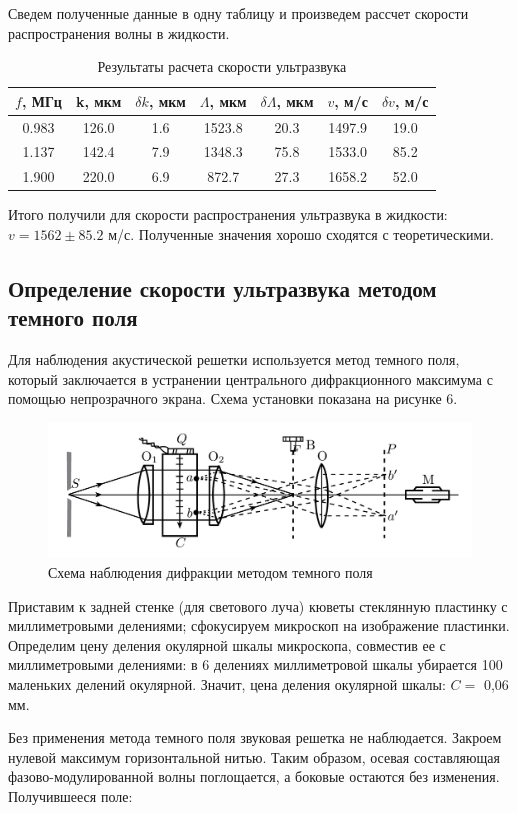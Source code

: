 \documentclass[a4paper, 12pt]{article}%
\begin{document}
	Сведем полученные данные в одну таблицу и произведем рассчет скорости распространения волны в жидкости.
	\begin{table}[H]
		\centering
		\begin{tabular}{|c|c|c|c|c|c|c|}
			\hline
			$f$, МГц     & k, мкм     & $\delta k$, мкм & $\Lambda$, мкм & $\delta \Lambda$, мкм & $v$, м/с      &  $\delta v$, м/с  \\ \hline
			0.983 & 126.0 & 1.6     & 1523.8 & 20.3         & 1497.9 & 19.0    \\ \hline
			1.137 & 142.4 & 7.9     & 1348.3 & 75.8         & 1533.0 & 85.2    \\ \hline
			1.900 & 220.0 & 6.9     & 872.7  & 27.3         & 1658.2 & 52.0    \\ \hline
		\end{tabular}
		\caption{Результаты расчета скорости ультразвука}
	\end{table}
	Итого получили для скорости распространения ультразвука в жидкости: $v = 1562 \pm 85.2$ м/с. Полученные значения хорошо сходятся с теоретическими.
	\subsection{Определение скорости ультразвука методом темного поля}
	
	Для наблюдения акустической решетки используется метод темного поля, который заключается в устранении центрального дифракционного максимума с помощью непрозрачного экрана. Схема установки показана на рисунке 6.
	\begin{figure}[H]
		\centering	
		\includegraphics[width=0.7\linewidth]{shema2.png}
		\caption{Схема наблюдения дифракции методом темного поля}
		\label{fig:}
	\end{figure}
	Приставим к задней стенке (для светового луча) кюветы стеклянную пластинку с миллиметровыми делениями; сфокусируем микроскоп на изображение пластинки. Определим цену деления окулярной шкалы микроскопа, совместив ее с миллиметровыми делениями: в 6 делениях миллиметровой шкалы убирается 100 маленьких делений окулярной. Значит, цена деления окулярной шкалы: $ C = $ 0,06 мм.
	
	Без применения метода темного поля звуковая решетка не наблюдается. Закроем нулевой максимум горизонтальной нитью. Таким образом, осевая составляющая фазово-модулированной волны поглощается, а боковые остаются без изменения. Получившееся поле: 
	
\end{document}
